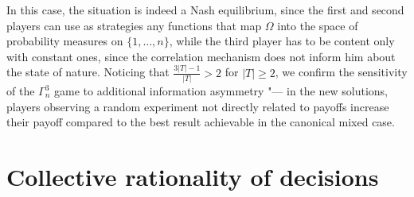 In this case, the situation is indeed a Nash equilibrium, since the first and second players can use as strategies any functions that map $\Omega$ into the space of probability measures on $\{1, \ldots, n\}$, while the third player has to be content only with constant ones, since the correlation mechanism does not inform him about the state of nature. Noticing that $\frac{3 \left| T \right| - 1}{\left| T \right|} > 2$ for $\left| T \right| \ge 2$, we confirm the sensitivity of the $\Gamma^3_n$ game to additional information asymmetry "--- in the new solutions, players observing a random experiment not directly related to payoffs increase their payoff compared to the best result achievable in the canonical mixed case. %

\section{Collective rationality of decisions}\label{sec:ch2/sec5}

